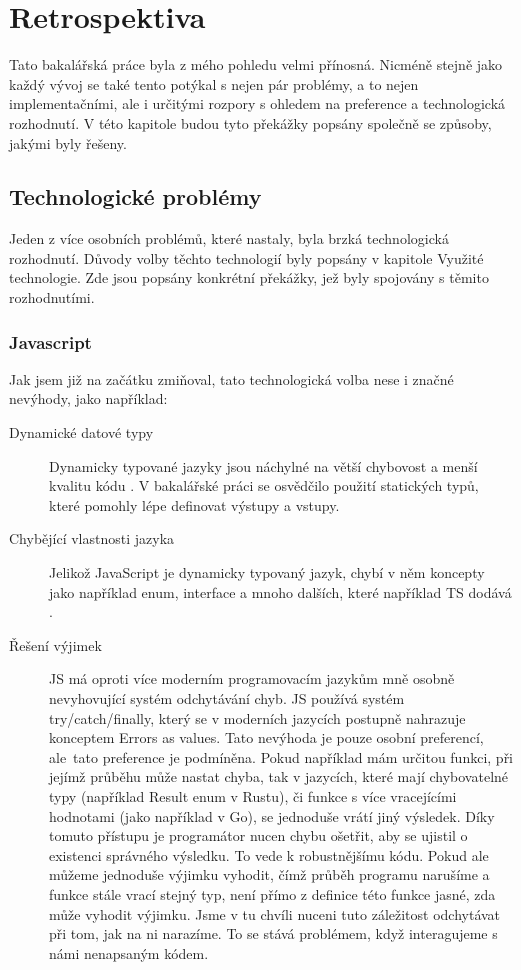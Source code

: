 \chapter{Retrospektiva} \label{retrospective}

Tato bakalářská práce byla z mého pohledu velmi přínosná. Nicméně stejně jako každý vývoj se také tento potýkal s nejen pár problémy, a to nejen implementačními, ale i určitými rozpory s ohledem na preference a technologická rozhodnutí. V této kapitole budou tyto překážky popsány společně se způsoby, jakými byly řešeny.

\section{Technologické problémy}

Jeden z více osobních problémů, které nastaly, byla brzká technologická rozhodnutí. Důvody volby těchto technologií byly popsány v kapitole Využité technologie. Zde jsou popsány konkrétní překážky, jež byly spojovány s těmito rozhodnutími.

\subsection{Javascript}
Jak jsem již na začátku zmiňoval, tato technologická volba nese i značné nevýhody, jako například:

\begin{description}
\item[Dynamické datové typy] 
Dynamicky typované jazyky jsou náchylné na větší chybovost a menší kvalitu kódu \cite{pang2018programming}. V bakalářské práci se osvědčilo použití statických typů, které pomohly lépe definovat výstupy a vstupy.
\item[Chybějící vlastnosti jazyka] 
Jelikož JavaScript je dynamicky typovaný jazyk, chybí v něm koncepty jako například enum, interface a mnoho dalších, které například TS dodává \cite{typescriptlangHandbookEnums, typescriptlangHandbookInterfaces}.
\item[Řešení výjimek]
JS má oproti více moderním programovacím jazykům mně osobně nevyhovující systém odchytávání chyb. JS používá systém try/catch/finally, který se v moderních jazycích postupně nahrazuje konceptem Errors as values. Tato nevýhoda je pouze osobní preferencí, ale~tato preference je podmíněna. Pokud například mám určitou funkci, při jejímž průběhu může nastat chyba, tak v jazycích, které mají chybovatelné typy (například Result enum v Rustu), či funkce s více vracejícími hodnotami (jako například v Go), se jednoduše vrátí jiný výsledek. Díky tomuto přístupu je programátor nucen chybu ošetřit, aby se ujistil o existenci správného výsledku. To vede k robustnějšímu kódu. Pokud ale můžeme jednoduše výjimku vyhodit, čímž průběh programu narušíme a funkce stále vrací stejný typ, není přímo z definice této funkce jasné, zda může vyhodit výjimku. Jsme v tu chvíli nuceni tuto záležitost odchytávat při tom, jak na ni narazíme. To se stává problémem, když interagujeme s námi nenapsaným kódem.
\end{description}

